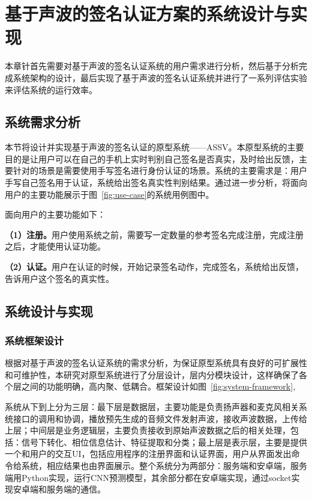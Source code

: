 \chapter{基于声波的签名认证方案的系统设计与实现}

本章针首先需要对基于声波的签名认证系统的用户需求进行分析，然后基于分析完成系统架构的设计，最后实现了基于声波的签名认证系统并进行了一系列评估实验来评估系统的运行效率。

\section{系统需求分析}

本节将设计并实现基于声波的签名认证的原型系统——ASSV。本原型系统的主要目的是让用户可以在自己的手机上实时判别自己签名是否真实，及时给出反馈，主要针对的场景是需要使用手写签名进行身份认证的场景。系统的主要需求是：用户手写自己签名用于认证，系统给出签名真实性判别结果。通过进一步分析，将面向用户的主要功能展示于图~\ref{fig:use-case}的系统用例图中。


面向用户的主要功能如下：

\textbf{（1）注册。}用户使用系统之前，需要写一定数量的参考签名完成注册，完成注册之后，才能使用认证功能。

\textbf{（2）认证。}用户在认证的时候，开始记录签名动作，完成签名，系统给出反馈，告诉用户这个签名的真实性。


\section{系统设计与实现}
\subsection{系统框架设计}

根据对基于声波的签名认证系统的需求分析，为保证原型系统具有良好的可扩展性和可维护性，本研究对原型系统进行了分层设计，层内分模块设计，这样确保了各个层之间的功能明确，高内聚、低耦合。框架设计如图~\ref{fig:system-framework},

系统从下到上分为三层：最下层是数据层，主要功能是负责扬声器和麦克风相关系统接口的调用和协调，播放预先生成的音频文件发射声波，接收声波数据，上传给上层；中间层是业务逻辑层，主要负责接收到原始声波数据之后的相关处理，包括：信号下转化、相位信息估计、特征提取和分类；最上层是表示层，主要是提供一个和用户的交互UI，包括应用程序的注册界面和认证界面，用户从界面发出命令给系统，相应结果也由界面展示。整个系统分为两部分：服务端和安卓端，服务端用Python实现，运行CNN预测模型，其余部分都在安卓端实现，通过socket实现安卓端和服务端的通信。 


